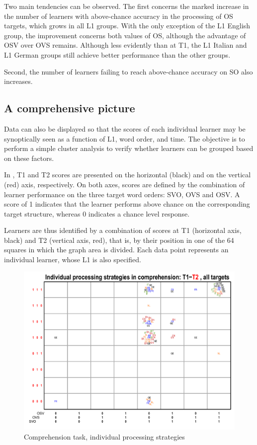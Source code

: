 Two main tendencies can be observed. The first concerns the marked increase in the number of learners with above-chance accuracy in the processing of OS targets, which grows in all L1 groups. With the only exception of the L1 English group, the improvement concerns both values of OS, although the advantage of OSV over OVS remains. Although less evidently than at T1, the L1 Italian and L1 German groups still achieve better performance than the other groups.

Second, the number of learners failing to reach above-chance accuracy on SO also increases.

\subsection{A comprehensive picture}\label{sec:05:2.4}

Data can also be displayed so that the scores of each individual learner may be synoptically seen as a function of L1, word order, and time. The objective is to perform a simple cluster analysis to verify whether learners can be grouped based on these factors. 

In , T1 and T2 scores are presented on the horizontal (black) and on the vertical (red) axis, respectively. On both axes, scores are defined by the combination of learner performance on the three target word orders: SVO, OVS and OSV. A score of 1 indicates that the learner performs above chance on the corresponding target structure, whereas 0 indicates a chance level response. 

Learners are thus identified by a combination of scores at T1 (horizontal axis, black) and T2 (vertical axis, red), that is, by their position in one of the 64 squares in which the graph area is divided. Each data point represents an individual learner, whose L1 is also specified.

\begin{figure}
    \includegraphics[width=\textwidth]{figures/05-7.pdf}
    \caption{Comprehension task, individual processing strategies}
    \label{fig:05:7}
\end{figure}

